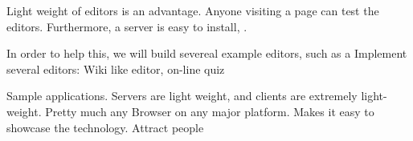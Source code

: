 \documentclass[10pt]{article}
\begin{document}
Light weight of editors is an advantage. Anyone visiting a page can test the editors. Furthermore, a server is easy to install, .

In order to help this, we will build severeal example editors, such as a 
Implement several editors: Wiki like editor, on-line quiz


Sample applications. Servers are light weight, and clients are extremely light-weight. Pretty much any Browser on any major platform. Makes it easy to showcase the technology. Attract people


%
% 
\end{document}
